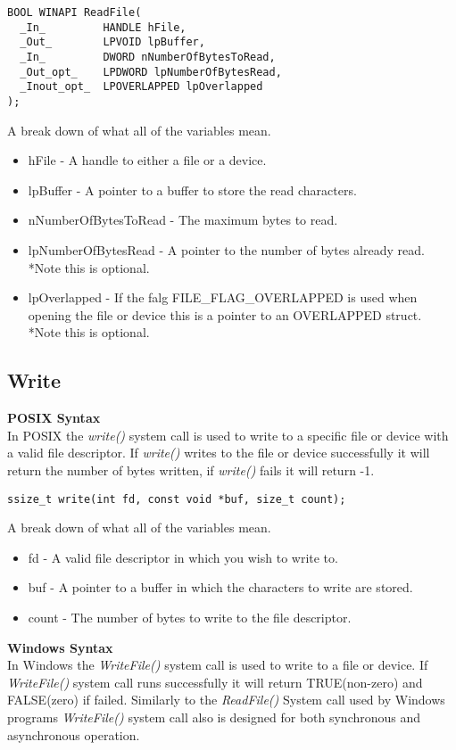 \documentclass[letterpaper,10pt,notitlepage,fleqn]{article}
\begin{document}
\begin{verbatim}
BOOL WINAPI ReadFile(
  _In_         HANDLE hFile,
  _Out_        LPVOID lpBuffer,
  _In_         DWORD nNumberOfBytesToRead,
  _Out_opt_    LPDWORD lpNumberOfBytesRead,
  _Inout_opt_  LPOVERLAPPED lpOverlapped
);
\end{verbatim}

A break down of what all of the variables mean.

\begin{itemize}
\item hFile - A handle to either a file or a device.
\item lpBuffer - A pointer to a buffer to store the read characters.
\item nNumberOfBytesToRead - The maximum bytes to read.
\item lpNumberOfBytesRead - A pointer to the number of bytes already read. *Note this is optional.
\item lpOverlapped - If the falg FILE\_FLAG\_OVERLAPPED is used when opening the file or device this is a pointer to an OVERLAPPED struct. *Note this is optional.
\end{itemize}

\subsection{Write}
\textbf{POSIX Syntax} \\
In POSIX the \textit{write()} system call is used to write to a specific file or device with a valid file descriptor. If \textit{write()} writes to the file or device successfully it will return the number of bytes written, if \textit{write()} fails it will return -1. 

\begin{verbatim}
ssize_t write(int fd, const void *buf, size_t count);
\end{verbatim}

A break down of what all of the variables mean.

\begin{itemize}
\item fd - A valid file descriptor in which you wish to write to.
\item buf - A pointer to a buffer in which the characters to write are stored.
\item count - The number of bytes to write to the file descriptor.
\end{itemize}

\textbf{Windows Syntax} \\
In Windows the \textit{WriteFile()} system call is used to write to a file or device. If \textit{WriteFile()} system call runs successfully it will return TRUE(non-zero) and FALSE(zero) if failed. Similarly to the \textit{ReadFile()} System call used by Windows programs \textit{WriteFile()} system call also is designed for both synchronous and asynchronous operation.
\end{document}
